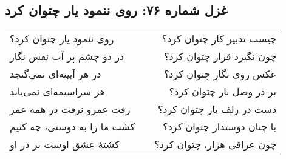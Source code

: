 \begin{center}
\section*{غزل شماره ۷۶: روی ننمود یار چتوان کرد}
\label{sec:076}
\begin{longtable}{l p{0.5cm} r}
روی ننمود یار چتوان کرد؟
&&
چیست تدبیر کار چتوان کرد؟
\\
در دو چشم پر آب نقش نگار
&&
چون نگیرد قرار چتوان کرد؟
\\
در هر آیینه‌ای نمی‌گنجد
&&
عکس روی نگار چتوان کرد؟
\\
هر سراسیمه‌ای نمی‌یابد
&&
بر در وصل بار چتوان کرد؟
\\
رفت عمرو نرفت در همه عمر
&&
دست در زلف یار چتوان کرد؟
\\
کشت ما را به دوستی، چه کنیم
&&
با چنان دوستدار چتوان کرد؟
\\
کشتهٔ عشق اوست بر در او
&&
چون عراقی هزار، چتوان کرد؟
\\
\end{longtable}
\end{center}
